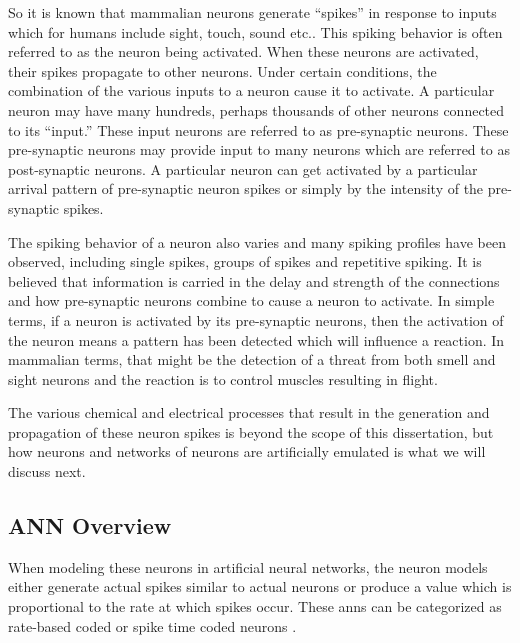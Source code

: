 \iftrue
So it is known that mammalian neurons generate ``spikes'' in response to inputs which for humans include sight, touch, sound etc.. This spiking behavior is often referred to as the neuron being activated.
When these neurons are activated, their spikes propagate to other neurons. Under certain conditions, the combination of the various inputs to a neuron cause it to activate. 
A particular neuron may have many hundreds, perhaps thousands of other neurons connected to its ``input.''
These input neurons are referred to as pre-synaptic neurons. These pre-synaptic neurons may provide input to many neurons which are referred to as post-synaptic neurons.
A particular neuron can get activated by a particular arrival pattern of pre-synaptic neuron spikes or simply by the intensity of the pre-synaptic spikes. 

The spiking behavior of a neuron also varies and many spiking profiles have been observed, including single spikes, groups of spikes and repetitive spiking. 
It is believed that information is carried in the delay and strength of the connections and how pre-synaptic neurons combine to cause a neuron to activate.
In simple terms, if a neuron is activated by its pre-synaptic neurons, then the activation of the neuron means a pattern has been detected which will influence a reaction.
In mammalian terms, that might be the detection of a threat from both smell and sight neurons and the reaction is to control muscles resulting in flight.


The various chemical and electrical processes that result in the generation and propagation of these neuron spikes is beyond the scope of this dissertation, but how neurons and networks of neurons are artificially emulated is what we will discuss next.


\subsection[ANN Overview]{ANN Overview}
\label{sec:ANN Overview}

When modeling these neurons in artificial neural networks, the neuron models either generate actual spikes similar to actual neurons or
produce a value which is proportional to the rate at which spikes occur.
These \acp{ann} can be categorized as rate-based coded or spike time coded neurons \cite{NNintro_Bullinaria}\cite{10.3389/fnsys.2015.00151}.


